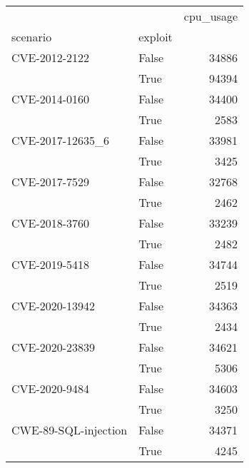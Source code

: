 \begin{tabular}{llr}
\toprule
                     &      &  cpu\_usage \\
scenario & exploit &            \\
\midrule
CVE-2012-2122 & False &      34886 \\
                     & True &      94394 \\
CVE-2014-0160 & False &      34400 \\
                     & True &       2583 \\
CVE-2017-12635\_6 & False &      33981 \\
                     & True &       3425 \\
CVE-2017-7529 & False &      32768 \\
                     & True &       2462 \\
CVE-2018-3760 & False &      33239 \\
                     & True &       2482 \\
CVE-2019-5418 & False &      34744 \\
                     & True &       2519 \\
CVE-2020-13942 & False &      34363 \\
                     & True &       2434 \\
CVE-2020-23839 & False &      34621 \\
                     & True &       5306 \\
CVE-2020-9484 & False &      34603 \\
                     & True &       3250 \\
CWE-89-SQL-injection & False &      34371 \\
                     & True &       4245 \\
\bottomrule
\end{tabular}
